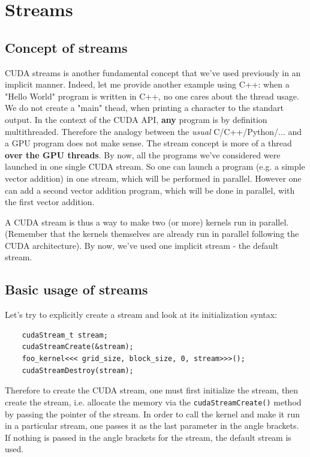 \section{Streams}
\label{sec:streams}
\subsection{Concept of streams}
CUDA streams is another fundamental concept that we've used previously in an implicit manner.
Indeed, let me provide another example using C++: when a "Hello World" program is written in C++, 
no one cares about the thread usage. We do not create a "main" thead, when printing a character to 
the standart output. In the context of the CUDA API, \textbf{any} program is by definition multithreaded. 
Therefore the analogy between the \textit{usual} C/C++/Python/... and a GPU program does not make sense.
The stream concept is more of a thread \textbf{over the GPU threads}. 
By now, all the programs we've considered were launched in one single CUDA stream. So one can launch a 
program (e.g. a simple vector addition) in one stream, which will be performed in parallel. However one can 
add a second vector addition program, which will be done in parallel, with the first vector addition.



A CUDA stream is thus a way to make two (or more) kernels run in parallel. (Remember that the kernels 
themselves are already run in parallel following the CUDA architecture). By now, we've used one implicit stream - the default stream.

\subsection{Basic usage of streams}
Let's try to explicitly create a stream and look at its initialization syntax:

\begin{listing}[ht!]
\begin{verbatim}
    cudaStream_t stream;
    cudaStreamCreate(&stream);
    foo_kernel<<< grid_size, block_size, 0, stream>>>();
    cudaStreamDestroy(stream);
\end{verbatim}
\end{listing}

Therefore to create the CUDA stream, one must first initialize the stream, then create the stream, i.e. 
allocate the memory via the \verb|cudaStreamCreate()| method by passing the pointer of the stream. 
In order to call the kernel and make it run in a particular stream, one passes it as the last parameter in the angle brackets.
If nothing is passed in the angle brackets for the stream, the default stream is used.


